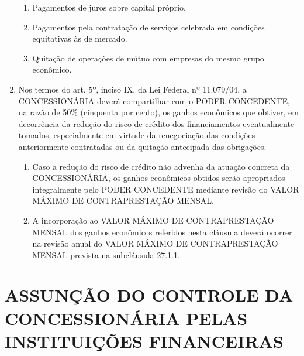\documentclass[a4paper,11pt]{report} %
\begin{document}
\begin{enumerate}
\begin{enumerate}[label*=\arabic*.]
\item \label{itm:NTS9}	Pagamentos de juros sobre capital próprio.

\item \label{itm:JUM6}	Pagamentos pela contratação de serviços celebrada em condições equitativas às de mercado.

\item \label{itm:ST7S}	Quitação de operações de mútuo com empresas do mesmo grupo econômico.
\end{enumerate}

\item \label{itm:QFR6}	Nos termos do art. 5º, inciso IX, da Lei Federal nº 11.079/04, a CONCESSIONÁRIA deverá compartilhar com o PODER CONCEDENTE, na razão de 50$\%$ (cinquenta por cento), os ganhos econômicos que obtiver, em decorrência da redução do risco de crédito dos financiamentos eventualmente tomados, especialmente em virtude da renegociação das condições anteriormente contratadas ou da quitação antecipada das obrigações.

\begin{enumerate}[label*=\arabic*.]
\item \label{itm:M7CQ}	Caso a redução do risco de crédito não advenha da atuação concreta da CONCESSIONÁRIA, os ganhos econômicos obtidos serão apropriados integralmente pelo PODER CONCEDENTE mediante revisão do VALOR MÁXIMO DE CONTRAPRESTAÇÃO MENSAL.

\item \label{itm:Q3AP}	A incorporação ao VALOR MÁXIMO DE CONTRAPRESTAÇÃO MENSAL dos ganhos econômicos referidos nesta cláusula deverá ocorrer na revisão anual do VALOR MÁXIMO DE CONTRAPRESTAÇÃO MENSAL prevista na subcláusula 27.1.1.
\end{enumerate}
\end{enumerate}

\section{ASSUNÇÃO DO CONTROLE DA CONCESSIONÁRIA PELAS INSTITUIÇÕES FINANCEIRAS}
\label{sec:6KH6}
\end{document}
